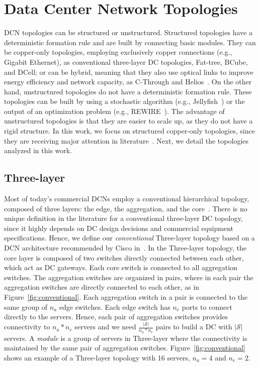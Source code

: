 \section{Data Center Network Topologies}
\label{sec:topologies}

DCN topologies can be structured or unstructured.
Structured topologies have a deterministic formation rule and are built by connecting basic modules. They can be copper-only topologies, employing exclusively copper connections (e.g., Gigabit Ethernet), as conventional three-layer DC topologies, Fat-tree, BCube, and DCell; or can be hybrid, meaning that they also use optical links to improve energy efficiency and network capacity, as C-Through and Helios~\cite{christoforos2012Optical}.
On the other hand, unstructured topologies do not have a deterministic formation rule. These topologies can be built by using a stochastic algorithm (e.g., Jellyfish~\cite{singla2012jellyfish}) or the output of an optimization problem (e.g., REWIRE~\cite{curtisrewire}). The advantage of unstructured topologies is that they are easier to scale up, as they do not have a rigid structure.
In this work, we focus on structured copper-only topologies, since they are receiving major attention in literature~\cite{raiciu2011improving,meng2010improving}. Next, we detail the topologies analyzed in this work.

\subsection{Three-layer}
\label{conventional}

Most of today's commercial DCNs employ a conventional hierarchical topology, composed of three layers: the edge, the aggregation, and the core~\cite{scotland}.
There is no unique definition in the literature for a conventional three-layer DC topology, since it highly depends on DC design decisions and commercial equipment specifications.
Hence, we define our \textit{conventional} Three-layer topology based on a DCN architecture recommended by Cisco in~\cite{scotland}. 
In the Three-layer topology, the core layer is composed of two switches directly connected between each other, which act as DC gateways. Each core switch is connected to all aggregation switches. The aggregation switches are organized in pairs, where in each pair the aggregation switches are directly connected to each other, as in Figure~\ref{fig:conventional}. Each aggregation switch in a pair is connected to the same group of $n_a$ edge switches. Each edge switch has $n_e$ ports to connect directly to the servers. Hence, each pair of aggregation switches provides connectivity to $n_a*n_e$ servers and we need $\frac{|\mathcal{S}|}{n_a*n_e}$ pairs to build a DC with $|\mathcal{S}|$ servers. A \textit{module} is a group of servers in Three-layer where the connectivity is maintained by the same pair of aggregation switches.
Figure~\ref{fig:conventional} shows an example of a Three-layer topology with 16 servers, $n_a=4$ and $n_e=2$.

